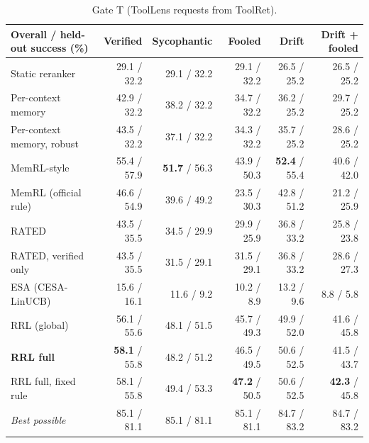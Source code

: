 \begin{table}[t]
\centering
\small
\setlength{\tabcolsep}{3.5pt}
\begin{tabular}{lrrrrr}
\toprule
Overall / held-out success (\%) & Verified & Sycophantic & Fooled & Drift & Drift + fooled \\
\midrule
Static reranker & 29.1 / 32.2 & 29.1 / 32.2 & 29.1 / 32.2 & 26.5 / 25.2 & 26.5 / 25.2 \\
Per-context memory & 42.9 / 32.2 & 38.2 / 32.2 & 34.7 / 32.2 & 36.2 / 25.2 & 29.7 / 25.2 \\
Per-context memory, robust & 43.5 / 32.2 & 37.1 / 32.2 & 34.3 / 32.2 & 35.7 / 25.2 & 28.6 / 25.2 \\
MemRL-style & 55.4 / 57.9 & \textbf{51.7} / 56.3 & 43.9 / 50.3 & \textbf{52.4} / 55.4 & 40.6 / 42.0 \\
MemRL (official rule) & 46.6 / 54.9 & 39.6 / 49.2 & 23.5 / 30.3 & 42.8 / 51.2 & 21.2 / 25.9 \\
RATED & 43.5 / 35.5 & 34.5 / 29.9 & 29.9 / 25.9 & 36.8 / 33.2 & 25.8 / 23.8 \\
RATED, verified only & 43.5 / 35.5 & 31.5 / 29.1 & 31.5 / 29.1 & 36.8 / 33.2 & 28.6 / 27.3 \\
ESA (CESA-LinUCB) & 15.6 / 16.1 & 11.6 / 9.2 & 10.2 / 8.9 & 13.2 / 9.6 & 8.8 / 5.8 \\
\midrule
RRL (global) & 56.1 / 55.6 & 48.1 / 51.5 & 45.7 / 49.3 & 49.9 / 52.0 & 41.6 / 45.8 \\
\textbf{RRL full} & \textbf{58.1} / 55.8 & 48.2 / 51.2 & 46.5 / 49.5 & 50.6 / 52.5 & 41.5 / 43.7 \\
RRL full, fixed rule & 58.1 / 55.8 & 49.4 / 53.3 & \textbf{47.2} / 50.5 & 50.6 / 52.5 & \textbf{42.3} / 45.8 \\
\textit{Best possible} & 85.1 / 81.1 & 85.1 / 81.1 & 85.1 / 81.1 & 84.7 / 83.2 & 84.7 / 83.2 \\
\bottomrule
\end{tabular}
\caption{Gate T (ToolLens requests from ToolRet).}
\label{tab:gatetl}
\end{table}
